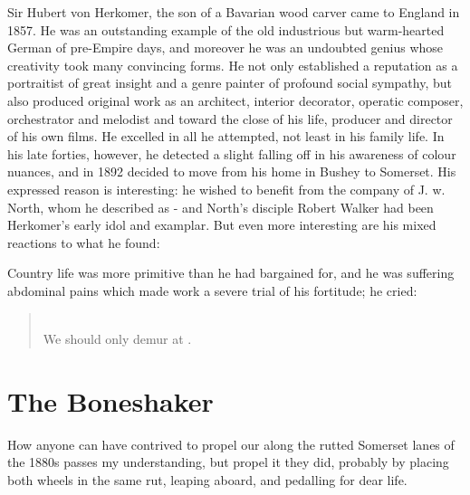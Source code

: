 Sir Hubert von Herkomer, the son of a Bavarian wood carver came to England in 1857. He was an outstanding example of the old industrious but warm-hearted German of pre-Empire days, and moreover he was an undoubted genius whose creativity took many convincing forms. He not only established a reputation as a portraitist of great insight and a genre painter of profound social sympathy, but also produced original work as an architect, interior decorator, operatic composer, orchestrator and melodist and toward the close of his life, producer and director of his own films. He excelled in all he attempted, not least in his family life. In his late forties, however, he detected a slight falling off in his awareness of colour nuances, and in 1892 decided to move from his home in Bushey to Somerset. His expressed reason is interesting: he wished to benefit from the company of J. w.  North, whom he described as  - and North's disciple Robert Walker had been Herkomer's early idol and examplar. But even more interesting are his mixed reactions to what he found:

 Country life was more primitive than he had bargained for, and he was suffering abdominal pains which made work a severe trial of his fortitude;  he cried:

\begin{quote}
 \\
We should only demur at .
\end{quote}


 
\section{The Boneshaker}

How anyone can have contrived to propel our  along the rutted Somerset lanes of the 1880s passes my understanding, but propel it they did, probably by placing both wheels in the same rut, leaping aboard, and pedalling for dear life.

